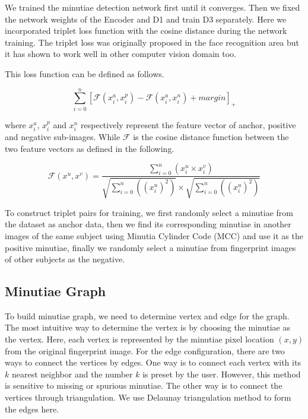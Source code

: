 We trained the minutiae detection network first until it converges.
Then we fixed the network weights of the Encoder and D1 and train D3 separately.
Here we incorporated triplet loss function with the cosine distance during the network training.
The triplet loss \cite{SchroffCVPR2015facenet} was originally proposed in the face recognition area but it has shown to work well in other computer vision domain too.

This loss function can be defined as follows.

\def \newf {\mathcal{F}}

\begin{equation}
	\sum_{i=0}^{n}[\newf(x_i^a, x_i^p) - \newf(x_i^a, x_i^n) + margin]_+
	\label{for:triplet-loss}
\end{equation}

where $x_i^a$, $x_i^p$ and $x_i^n$ respectively represent the feature vector of anchor, positive and negative sub-images.
While $\newf$ is the cosine distance function between the two feature vectors as defined in the following.

\begin{equation}
	\newf(x^u, x^v) = \frac{\sum_{i=0}^{n}(x_i^u \times x_i^v)}{\sqrt{\sum_{i=0}^{n}((x^u_i)^2)} \times \sqrt{\sum_{i=0}^{n}((x_i^u)^2)}}
	\label{for:cos-triplet-loss}
\end{equation}

To construct triplet pairs for training, we first randomly select a minutiae from the dataset as anchor data, then we find its corresponding minutiae in another images of the same subject using Minutia Cylinder Code (MCC) \cite{CappelliTPAMI2010mcc} and use it as the positive minutiae, finally we randomly select a minutiae from fingerprint images of other subjects as the negative.


\subsection{Minutiae Graph}
To build minutiae graph, we need to determine vertex and edge for the graph. The most intuitive way to determine the vertex is by choosing the minutiae as the vertex. Here, each vertex is represented by the minutiae pixel location $(x, y)$ from the original fingerprint image. For the edge configuration, there are two ways to connect the vertices by edges. One way is to connect each vertex with its $k$ nearest neighbor and the number $k$ is preset by the user. However, this method is sensitive to missing or spurious minutiae. The other way is to connect the vertices through triangulation. We use Delaunay triangulation method to form the edges here.

